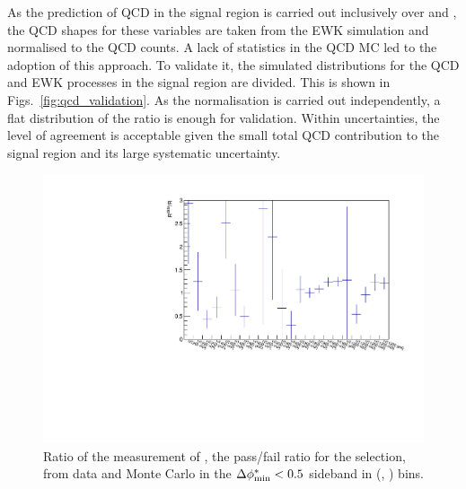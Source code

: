 As the prediction of QCD in the signal region is carried out
inclusively over \nb and \mht, the QCD shapes for these variables are
taken from the EWK simulation and normalised to the QCD counts. 
A lack of statistics in
the QCD MC led to the adoption of this approach. To validate it, the simulated \mht distributions
for the QCD and EWK processes in the signal region are divided. This is shown in
Figs.~\ref{fig:qcd_validation}.%
As the normalisation is carried out independently, a flat distribution
of the ratio is enough for validation. Within uncertainties, the level of agreement is acceptable given the
small total QCD contribution to the signal region and its large
systematic uncertainty.

\begin{figure}[h!]
  \begin{center}        
    \includegraphics[width=\textwidth]{figures/qcd/qcdANPlots/doubleQcdSbSrRatio1D}
    \caption{ Ratio of the measurement of \rmhtmet, the pass/fail
      ratio for the \mhtmet selection, from data and Monte Carlo in
      the $\mbox{$\Delta\phi^{*}_{\rm min}$} < 0.5$ sideband in (\scalht, \njet) bins.   
    }
    \label{fig:RR_qcd}
  \end{center} 
\end{figure}

